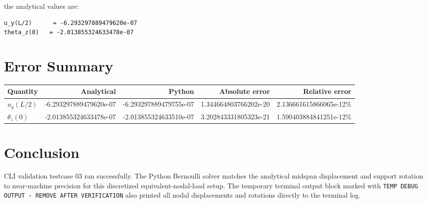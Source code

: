 \documentclass[11pt]{article}
\begin{document}
the analytical values are:

\begin{lstlisting}
u_y(L/2)      = -6.293297889479620e-07
theta_z(0)   = -2.013855324633478e-07
\end{lstlisting}

\section{Error Summary}

\begin{center}
\begin{tabular}{lrrrr}
\toprule
Quantity & Analytical & Python & Absolute error & Relative error \\
\midrule
$u_y(L/2)$
& -6.293297889479620e-07
& -6.293297889479755e-07
& 1.344664803766202e-20
& 2.136661615866065e-12\% \\
$\theta_z(0)$
& -2.013855324633478e-07
& -2.013855324633510e-07
& 3.202843331805323e-21
& 1.590403884841251e-12\% \\
\bottomrule
\end{tabular}
\end{center}

\section{Conclusion}

CLI validation testcase 03 ran successfully. The Python Bernoulli solver
matches the analytical midspan displacement and support rotation to
near-machine precision for this discretized equivalent-nodal-load setup. The
temporary terminal output block marked with
\texttt{TEMP DEBUG OUTPUT - REMOVE AFTER VERIFICATION} also printed all nodal
displacements and rotations directly to the terminal log.
\end{document}
